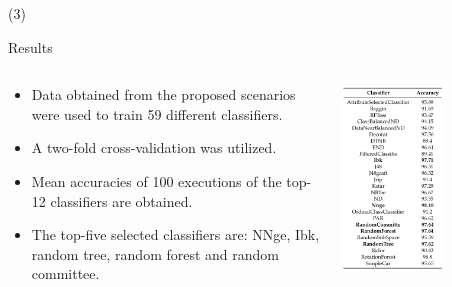 \begin{frame}{ (3)}
\begin{block}{Results} 
\begin{columns}
\begin{column}{0.7\textwidth}
\begin{itemize}
\item Data obtained from the proposed scenarios were used to train 59 different classifiers.
\item A two-fold cross-validation was utilized.
\item Mean accuracies of 100 executions of the top-12 classifiers are obtained.
\item The top-five selected classifiers are: NNge, Ibk, random tree, random forest and random committee.
\end{itemize}
\end{column}
\begin{column}{0.3\textwidth}  
    \begin{center}
     \includegraphics[width=0.6\textwidth]{Figs/IndoorPositionSystem5}
     \end{center}
\end{column}
\end{columns}


\end{block}
\end{frame}
